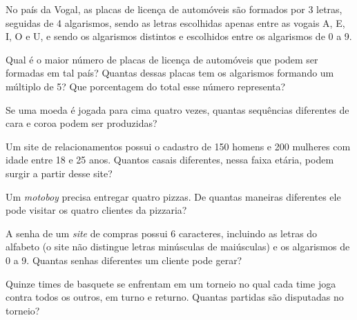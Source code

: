 \documentclass[10pt,a4paper]{article}
\begin{document}
\begin{multicols}{2}
    \begin{question}[type=exam]
        No país da Vogal, as placas de licença de automóveis são formados por
        3 letras, seguidas de 4 algarismos, sendo as letras escolhidas apenas
        entre as vogais A, E, I, O e U, e sendo os algarismos distintos e escolhidos
        entre os algarismos de 0 a 9.

        \begin{tasks}
            \task Qual é o maior número de placas de licença de automóveis que podem
            ser formadas em tal país?
            \task Quantas dessas placas tem os algarismos formando um múltiplo de 5?
            Que porcentagem do total esse número representa?
        \end{tasks}
    \end{question}

    \begin{question}[type=exam]
        Se uma moeda é jogada para cima quatro vezes, quantas sequências diferentes de
        cara e coroa podem ser produzidas?
    \end{question}

    \begin{question}[type=exam]
        Um site de relacionamentos possui o cadastro de 150 homens e 200 mulheres
        com idade entre 18 e 25 anos. Quantos casais diferentes, nessa faixa etária,
        podem surgir a partir desse site?
    \end{question}

    \begin{question}[type=exam]
        Um \textit{motoboy} precisa entregar quatro pizzas. De quantas maneiras
        diferentes ele pode visitar os quatro clientes da pizzaria?
    \end{question}

    \begin{question}[type=exam]
        A senha de um \textit{site} de compras possui 6 caracteres, incluindo as letras
        do alfabeto (o site não distingue letras minúsculas de maiúsculas) e os algarismos de 0 a 9. Quantas senhas diferentes um cliente
        pode gerar?
    \end{question}

    \begin{question}[type=exam]
        Quinze times de basquete se enfrentam em um torneio no qual cada time
        joga contra todos os outros, em  turno e returno. Quantas partidas são
        disputadas no torneio?
    \end{question}


\end{multicols}
\end{document}
